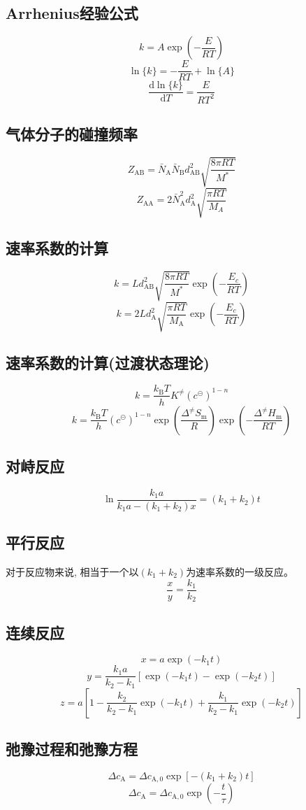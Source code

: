 \documentclass[twocolumn]{article}
\newcommand{\equ}[1]{\begin{equation*}#1\end{equation*}}
\newcommand{\rmd}{\mathrm{d}}
\newcommand{\std}{^{\circleddash}}
\newcommand{\xkh}[1]{\left(#1\right)}
\newcommand{\pf}{^{2}}
\renewcommand{\dfrac}[2]{\frac{\rmd #1}{\rmd #2}}
\begin{document}
\subsection{Arrhenius经验公式}
\equ{k=A\exp\xkh{-\frac{E}{RT}}}       
\equ{\ln\{k\}=-\frac{E}{RT}+\ln\{A\}}
\equ{\dfrac{\ln\{k\}}{T}=\frac{E}{RT\pf}}
\subsection{气体分子的碰撞频率}
\equ{Z_{\mathrm{AB}}=\bar{N}_{\mathrm{A}}\bar{N}_{\mathrm{B}}d_{\mathrm{AB}}\pf\sqrt{\frac{8\pi RT}{M^{*}}}}
\equ{Z_{\mathrm{AA}}=2\bar{N}_{\mathrm{A}}\pf d_{\mathrm{A}}\pf\sqrt{\frac{\pi RT}{M_{A}}}}
\subsection{速率系数的计算}
\equ{k=Ld_{\mathrm{AB}}\pf\sqrt{\frac{8\pi RT}{M^{*}}}\exp\xkh{-\frac{E_{c}}{RT}}}
\equ{k=2Ld_{\mathrm{A}}\pf\sqrt{\frac{\pi RT}{M_{\mathrm{A}}}}\exp\xkh{-\frac{E_{c}}{RT}}}
\subsection{速率系数的计算(过渡状态理论)}
\equ{k=\frac{k_{\mathrm{B}}T}{h}K^{\neq}\xkh{c\std}^{1-n}}
\equ{k=\frac{k_{\mathrm{B}}T}{h}\xkh{c\std}^{1-n}\exp\xkh{\frac{\Delta^{\neq }S_{\mathrm{m}}}{R}}\exp\xkh{{-\frac{\Delta^{\neq} H_{\mathrm{m}}}{RT}}}}
\subsection{对峙反应}
\equ{\ln\frac{k_{1}a}{k_{1}a-\xkh{k_{1}+k_{2}}x}=\xkh{k_{1}+k_{2}}t}
\subsection{平行反应}
对于反应物来说, 相当于一个以$\xkh{k_{1}+k_{2}}$为速率系数的一级反应。
\equ{\frac{x}{y}=\frac{k_{1}}{k_{2}}}
\subsection{连续反应}
\equ{x=a\exp\xkh{-k_{1}t}}
\equ{y=\frac{k_{1}a}{k_{2}-k_{1}}\left[ \exp\xkh{-k_{1}t}-\exp\xkh{-k_{2}t} \right]}
\equ{z=a\left[ 1-\frac{k_{2}}{k_{2}-k_{1}}\exp\xkh{-k_{1}t}+\frac{k_{1}}{k_{2}-k_{1}}\exp\xkh{-k_{2}t} \right]}
\subsection{弛豫过程和弛豫方程}
\equ{\Delta c_{\mathrm{A}}=\Delta c_{\mathrm{A}, 0}\exp\left[ -\xkh{k_{1}+k_{2}}t \right]}
\equ{\Delta c_{\mathrm{A}}=\Delta c_{\mathrm{A}, 0}\exp\xkh{-\frac{t}{\tau}}}
\end{document}
